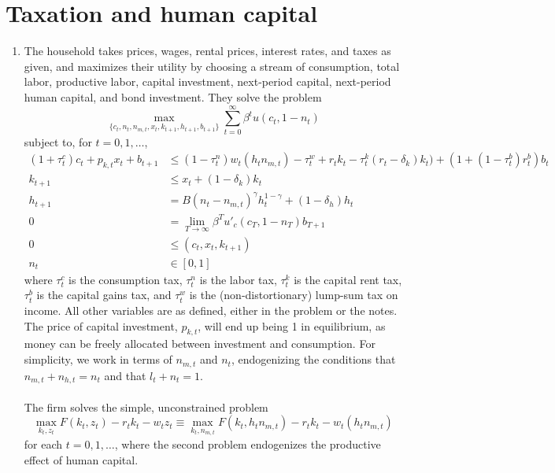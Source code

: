 \documentclass[10pt]{article}
\begin{document}
\maketitle


\section*{Taxation and human capital}

\begin{enumerate}
	\item The household takes prices, wages, rental prices, interest rates, and taxes as given, and maximizes their utility by choosing a stream of consumption, total labor, productive labor, capital investment, next-period capital, next-period human capital, and bond investment. They solve the problem \[\max_{\{c_t,n_t,n_{m,t},x_t,k_{t+1},h_{t+1},b_{t+1}\}} \sum_{t=0}^\infty \beta^t u(c_t,1-n_t)\]subject to, for $t = 0,1,\dots$, \begin{align*} (1+\tau_t^c)c_t + p_{k,t}x_t + b_{t+1} &\le (1-\tau_t^n)w_t (h_tn_{m,t}) - \tau^w_t + r_tk_t - \tau_t^k(r_t-\delta_k)k_t) + (1+(1-\tau_t^b)r_t^b)b_t \\ k_{t+1} &\le x_t + (1-\delta_k)k_t\\ h_{t+1} &= B(n_t-n_{m,t})^\gamma h_t^{1-\gamma} + (1-\delta_h)h_t \\ 0 &= \lim_{T\to\infty} \beta^T u'_c(c_T,1-n_T)b_{T+1} \\0 &\le (c_t,x_t,k_{t+1}) \\ n_t &\in [0,1]\end{align*}where $\tau_t^c$ is the consumption tax, $\tau_t^n$ is the labor tax, $\tau_t^k$ is the capital rent tax, $\tau_t^b$ is the capital gains tax, and $\tau_t^w$ is the (non-distortionary) lump-sum tax on income. All other variables are as defined, either in the problem or the notes. The price of capital investment, $p_{k,t}$, will end up being 1 in equilibrium, as money can be freely allocated between investment and consumption. For simplicity, we work in terms of $n_{m,t}$ and $n_t$, endogenizing the conditions that $n_{m,t} + n_{h,t} = n_t$ and that $l_t + n_t = 1$. \\ \\ The firm solves the simple, unconstrained problem \[\max_{k_t,z_t} F(k_t,z_t) - r_tk_t - w_tz_t \equiv \max_{k_t,n_{m,t}} F(k_t,h_tn_{m,t}) - r_tk_t - w_t(h_tn_{m,t})\]for each $t = 0,1,\dots$, where the second problem endogenizes the productive effect of human capital.

\end{enumerate}
\end{document}
